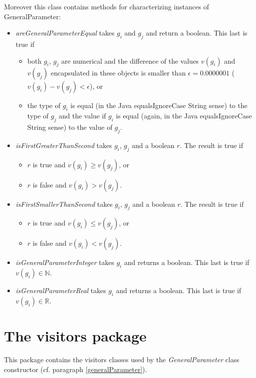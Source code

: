 \documentclass[a4paper,11pt] {ivoa}
\begin{document}
\noindent Moreover this class contains methods for characterizing  instances of GeneralParameter:
\begin{itemize}
\item {\it areGeneralParameterEqual} takes $g_i$ and $g_j$ and return a boolean. This last is true if 
\begin{itemize}
\item both $g_i$, $g_j$ are numerical and the difference of the values $v(g_i)$ and $v(g_j)$ encapsulated in these objects is smaller than $\epsilon = 0.0000001$ ($v(g_i)-v(g_j)<\epsilon$), or 
\item the type of $g_i$  is equal (in the Java equalsIgnoreCase String sense) to the type of $g_j$ and the value if $g_i$ is equal (again, in the Java equalsIgnoreCase String sense) to the value of $g_j$.
\end{itemize} 
\item {\it isFirstGreaterThanSecond} takes $g_i$, $g_j$ and a boolean $r$. The result is true if 
\begin{itemize}
\item $r$ is true and $v(g_i) \geq v(g_j)$, or
\item $r$ is false and $v(g_i) > v(g_j)$.
\end{itemize}
\item {\it isFirstSmallerThanSecond} takes $g_i$, $g_j$ and a boolean $r$. The result is true if 
\begin{itemize}
\item $r$ is true and $v(g_i) \leq v(g_j)$, or
\item $r$ is false and $v(g_i) < v(g_j)$.
\end{itemize}
\item {\it isGeneralParameterInteger} takes $g_i$ and returns a boolean. This last is true if $v(g_i) \in \mathbb N$.
\item {\it isGeneralParameterReal} takes $g_i$ and returns a boolean. This last is true if $v(g_i) \in \mathbb R$.
\end{itemize}
 
 \section{The visitors package}\label{visitor}
This package contains the visitors classes used by the {\it GeneralParameter} class constructor (cf. paragraph \ref{generalParameter}).\\
\end{document}
